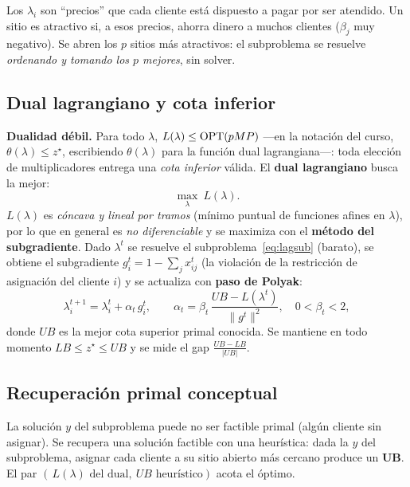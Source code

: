 \begin{intuicion}
Los $\lambda_i$ son ``precios'' que cada cliente está dispuesto a pagar por ser atendido. Un sitio
es atractivo si, a esos precios, ahorra dinero a muchos clientes ($\beta_j$ muy negativo). Se
abren los $p$ sitios más atractivos: el subproblema se resuelve \emph{ordenando y tomando los $p$
mejores}, sin solver.
\end{intuicion}

\subsection{Dual lagrangiano y cota inferior}
\textbf{Dualidad débil.} Para todo $\lambda$, $L(\lambda)\le \mathrm{OPT}(pMP)$ —en la notación del curso,
$\theta(\lambda)\le z^\star$, escribiendo $\theta(\lambda)$ para la función dual lagrangiana—: toda
elección de multiplicadores entrega una \emph{cota inferior} válida. El \textbf{dual lagrangiano}
busca la mejor:
\[
  \max_{\lambda}\ L(\lambda).
\]
$L(\lambda)$ es \emph{cóncava y lineal por tramos} (mínimo puntual de funciones afines en
$\lambda$), por lo que en general es \emph{no diferenciable} y se maximiza con el \textbf{método
del subgradiente}. Dado $\lambda^t$ se resuelve el subproblema~\eqref{eq:lagsub} (barato), se
obtiene el subgradiente $g^t_i = 1-\sum_j x^t_{ij}$ (la violación de la restricción de asignación
del cliente $i$) y se actualiza con \textbf{paso de Polyak}:
\[
  \lambda^{t+1}_i=\lambda^t_i+\alpha_t\,g^t_i,
  \qquad
  \alpha_t=\beta_t\,\frac{UB-L(\lambda^t)}{\lVert g^t\rVert^2},
  \quad 0<\beta_t<2,
\]
donde $UB$ es la mejor cota superior primal conocida. Se mantiene en todo momento
$LB\le z^\star\le UB$ y se mide el gap $\frac{UB-LB}{|UB|}$.

\subsection{Recuperación primal conceptual}
La solución $y$ del subproblema puede no ser factible primal (algún cliente sin asignar). Se
recupera una solución factible con una heurística: dada la $y$ del subproblema, asignar cada
cliente a su sitio abierto más cercano produce un \textbf{UB}. El par
$(\,L(\lambda)\text{ del dual},\ UB\text{ heurístico})$ acota el óptimo.

